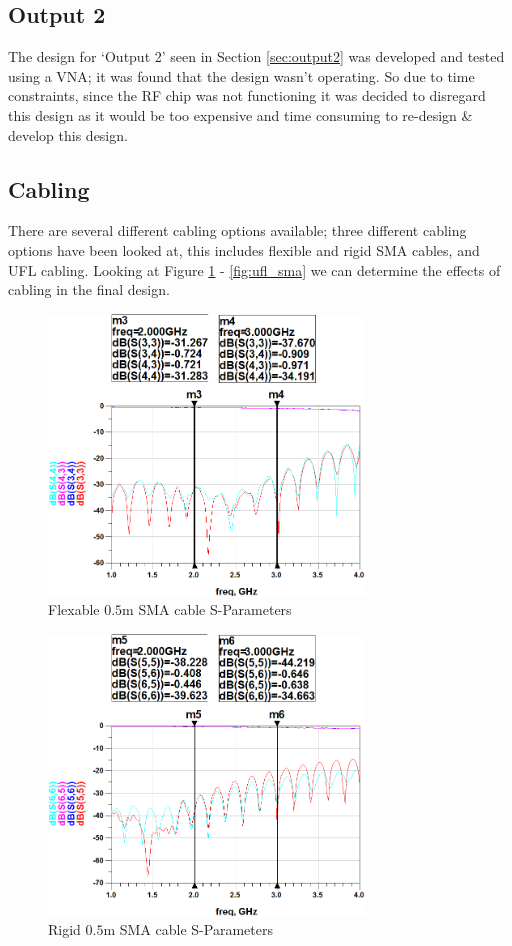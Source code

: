 \documentclass[12pt,openany,a4paper]{book}
\begin{document}
\subsection{Output 2}		\label{sec:res_out2}
The design for `Output 2' seen in Section \ref{sec:output2} was developed and tested using a VNA; it was found that the design wasn't operating. So due to time constraints, since the RF chip was not functioning it was decided to disregard this design as it would be too expensive and time consuming to re-design \& develop this design.


\subsection{Cabling}		\label{sec:res_cabling}
There are several different cabling options available; three different cabling options have been looked at, this includes flexible and rigid SMA cables, and UFL cabling. Looking at Figure \ref{fig:flex_sma} - \ref{fig:ufl_sma} we can determine the effects of cabling in the final design.
\begin{figure}[H]
	\centering
	\includegraphics[width=0.75\textwidth]{SMA-flex.png}
	\caption{Flexable $0.5$m SMA cable S-Parameters}
	\label{fig:flex_sma}
\end{figure} 
\begin{figure}[H]
	\centering
	\includegraphics[width=0.75\textwidth]{SMA-rig.png}
	\caption{Rigid $0.5$m SMA cable S-Parameters}
	\label{fig:rigid_sma}
\end{figure} 
\end{document}
